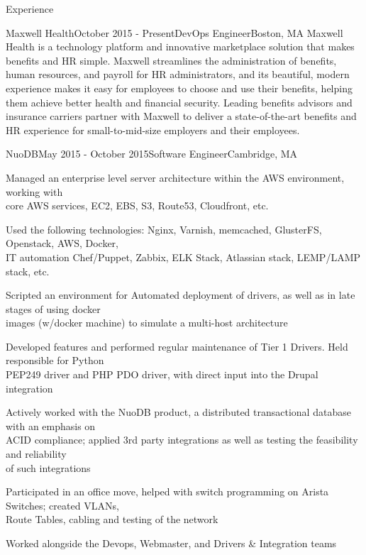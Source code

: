 \documentclass{resume} %
\begin{document}
\begin{rSection}{Experience}

\begin{rSubsection}{Maxwell Health}{October 2015 - Present}{DevOps Engineer}{Boston, MA}
Maxwell Health is a technology platform and innovative marketplace solution that makes benefits and HR simple. Maxwell streamlines the administration of benefits, human resources, and payroll for HR administrators, and its beautiful, modern experience makes it easy for employees to choose and use their benefits, helping them achieve better health and financial security. Leading benefits advisors and insurance carriers partner with Maxwell to deliver a state-of-the-art benefits and HR experience for small-to-mid-size employers and their employees.
\end{rSubsection}



\begin{rSubsection}{NuoDB}{May 2015 - October 2015}{Software Engineer}{Cambridge, MA}
	      \item Managed an enterprise level server architecture within the AWS environment, working with 
	      \\core AWS services, EC2, EBS, S3, Route53, Cloudfront, etc. 
          \item Used the following technologies: Nginx, Varnish, memcached, GlusterFS, Openstack, AWS, Docker,\\ IT automation Chef/Puppet, Zabbix, ELK Stack, Atlassian stack, LEMP/LAMP stack, etc.  
          \item Scripted an environment for Automated deployment of drivers, as well as in late stages of using docker\\ images (w/docker machine) to simulate a multi-host architecture
          \item Developed features and performed regular maintenance of Tier 1 Drivers. Held responsible for Python\\ PEP249 driver and PHP PDO driver, with direct input into the Drupal integration
          \item Actively worked with the NuoDB product, a distributed transactional database with an emphasis on\\ ACID compliance; applied 3rd party integrations as well as testing the feasibility and reliability\\ of such integrations
          \item Participated in an office move, helped with switch programming on Arista Switches; created VLANs, \\Route Tables, cabling and testing of the network
          \item Worked alongside the Devops, Webmaster, and Drivers \& Integration teams
\end{rSubsection}


\end{rSection}
\end{document}
